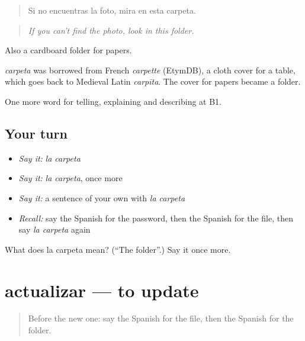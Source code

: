\begin{quote}
Si no encuentras la foto, mira en esta carpeta.
\end{quote}

\begin{quote}
\emph{If you can't find the photo, look in this folder.}
\end{quote}

Also a cardboard folder for papers.

\begin{cousinweb}
\emph{carpeta} was borrowed from French \emph{carpette} (EtymDB), a cloth cover for a table, which goes back to Medieval Latin \emph{carpīta}. The cover for papers became a folder.
\end{cousinweb}

\begin{grammarlens}[title={What you've built}]
One more word for telling, explaining and describing at B1.
\end{grammarlens}

\subsection*{Your turn}
\begin{itemize}
\raggedright
  \item \emph{Say it:} \emph{la carpeta}
  \item \emph{Say it:} \emph{la carpeta}, once more
  \item \emph{Say it:} a sentence of your own with \emph{la carpeta}
  \item \emph{Recall:} say the Spanish for the password, then the Spanish for the file, then say \emph{la carpeta} again
\end{itemize}

\begin{tcolorbox}[breakable,colback=teal!4,colframe=teal!35!black,title={Before you move on}]
What does la carpeta mean? (\textquotedblleft{}The folder\textquotedblright{}.) Say it once more.
\end{tcolorbox}
\section[actualizar]{actualizar — to update}

\label{lesson:ES-C776-actualizar}



\begin{quote}
Before the new one: say the Spanish for the file, then the Spanish for the folder.
\end{quote}


